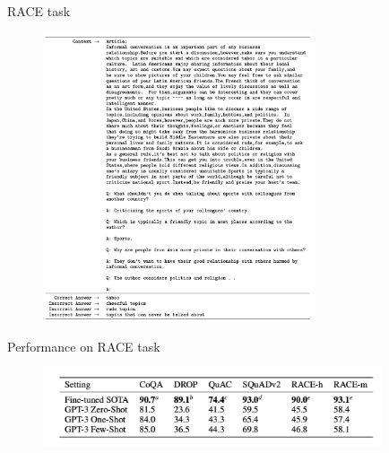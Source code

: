 \begin{vbframe}{RACE task}

\vfill

	\begin{figure}
		\centering
		\includegraphics[width=8cm]{figure/raceformat,h.png}
	\end{figure}
	
\vfill

\end{vbframe}




\begin{vbframe}{Performance on RACE task}

\vfill

	\begin{figure}
		\centering
		\includegraphics[width=10cm]{figure/raceperf.png}
	\end{figure}

\vfill

\end{vbframe}




